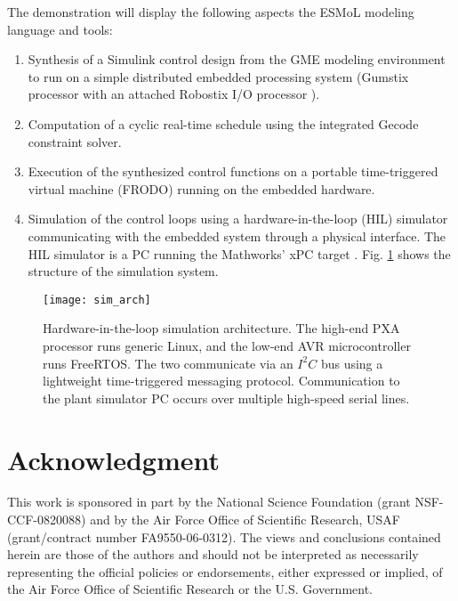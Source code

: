The demonstration will display the following aspects the ESMoL modeling 
language and tools:

\begin{enumerate}
\item Synthesis of a Simulink control design from the GME modeling 
environment \cite{mic:gme} to run on a simple distributed embedded processing
system (Gumstix processor with an attached Robostix I/O processor
\cite{gumstix}).
\item Computation of a cyclic real-time schedule using the integrated 
Gecode constraint solver\cite{gecode}\cite{sw:offlinescheduling}.
\item Execution of the synthesized control functions on a portable 
time-triggered virtual machine (FRODO\cite{RT_Thesis}) running on the 
embedded hardware.
\item Simulation of the control loops using a hardware-in-the-loop 
(HIL) simulator communicating with the embedded system through a physical 
interface.  The HIL simulator is a PC running the Mathworks' xPC target
\cite{mathworks:tools}.  Fig. \ref{fig:sim_arch} shows the structure of
the simulation system.
\end{enumerate}

\begin{figure}[!t]
\centering
\texttt{[image: sim\_arch]}
\caption{Hardware-in-the-loop simulation architecture. The high-end
PXA processor runs generic Linux, and the low-end AVR microcontroller runs FreeRTOS.
The two communicate via an $I^2C$ bus using a lightweight time-triggered messaging
protocol. Communication to the plant simulator PC occurs over multiple 
high-speed serial lines.}
\label{fig:sim_arch}
\end{figure}

\section*{Acknowledgment}

This work is sponsored in part by the National Science Foundation 
(grant NSF-CCF-0820088) and by the Air Force Office of Scientific 
Research, USAF (grant/contract number FA9550-06-0312).  The views 
and conclusions contained herein are those of the authors and 
should not be interpreted as necessarily representing the official 
policies or endorsements, either expressed or implied, of the Air 
Force Office of Scientific Research or the U.S. Government.





